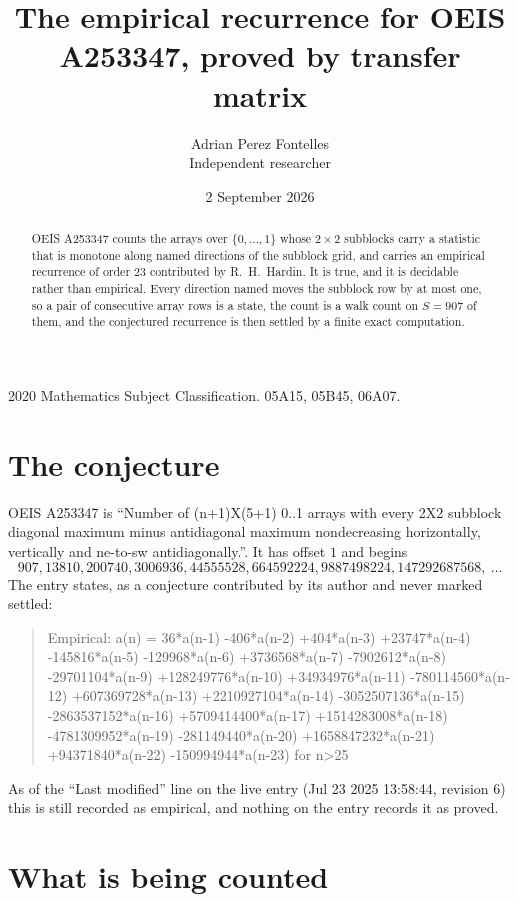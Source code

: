 \documentclass[11pt,a4paper]{article}
\title{The empirical recurrence for OEIS A253347, proved by transfer matrix}
\author{Adrian Perez Fontelles\\ \small Independent researcher}
\date{2 September 2026}
\theoremstyle{plain}
\theoremstyle{definition}
\begin{document}
\maketitle

\begin{abstract}
OEIS A253347 counts the arrays over $\{0,\dots,1\}$ whose $2\times2$ subblocks carry a
statistic that is monotone along named directions of the subblock grid, and carries an
empirical recurrence of order $23$ contributed by R.~H.~Hardin. It is true, and it is
decidable rather than empirical. Every direction named moves the subblock row by at most one,
so a pair of consecutive array rows is a state, the count is a walk count on $S=907$ of them,
and the conjectured recurrence is then settled by a finite exact computation.
\end{abstract}

\noindent\small 2020 Mathematics Subject Classification. 05A15, 05B45, 06A07.\normalsize

\section{The conjecture}

OEIS A253347 is ``Number of (n+1)X(5+1) 0..1 arrays with every 2X2 subblock diagonal maximum minus antidiagonal maximum nondecreasing horizontally, vertically and ne-to-sw antidiagonally.''. It has offset $1$ and begins
\[
907, 13810, 200740, 3006936, 44555528, 664592224, 9887498224, 147292687568,\ \dots
\]
The entry states, as a conjecture contributed by its author and never marked settled:
\begin{quote}
Empirical: a(n) = 36*a(n-1) -406*a(n-2) +404*a(n-3) +23747*a(n-4) -145816*a(n-5) -129968*a(n-6) +3736568*a(n-7) -7902612*a(n-8) -29701104*a(n-9) +128249776*a(n-10) +34934976*a(n-11) -780114560*a(n-12) +607369728*a(n-13) +2210927104*a(n-14) -3052507136*a(n-15) -2863537152*a(n-16) +5709414400*a(n-17) +1514283008*a(n-18) -4781309952*a(n-19) -281149440*a(n-20) +1658847232*a(n-21) +94371840*a(n-22) -150994944*a(n-23) for n>25
\end{quote}
As of the ``Last modified'' line on the live entry (Jul 23 2025 13:58:44, revision 6) this is still
recorded as empirical, and nothing on the entry records it as proved.

\section{What is being counted}
\end{document}

